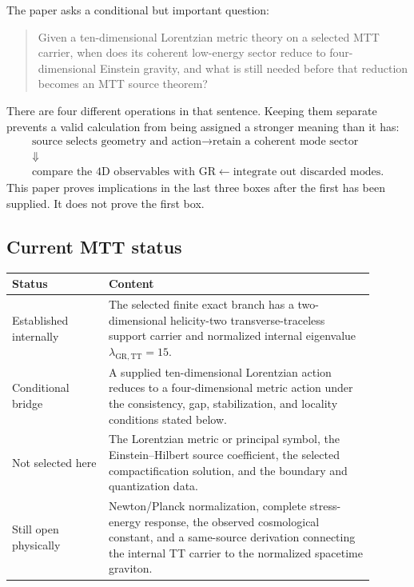 \documentclass[11pt,a4paper]{article}
\theoremstyle{definition}
\theoremstyle{remark}
\newcommand{\TT}{\mathrm{TT}}
\begin{document}
The paper asks a conditional but important question:
\begin{quote}
Given a ten-dimensional Lorentzian metric theory on a selected MTT carrier,
when does its coherent low-energy sector reduce to four-dimensional Einstein
gravity, and what is still needed before that reduction becomes an MTT source
theorem?
\end{quote}
There are four different operations in that sentence.  Keeping them separate
prevents a valid calculation from being assigned a stronger meaning than it
has:
\[
\begin{gathered}
\boxed{\text{source selects geometry and action}}
\longrightarrow
\boxed{\text{retain a coherent mode sector}}
\\[1mm]
\Downarrow
\\[-1mm]
\boxed{\text{compare the 4D observables with GR}}
\longleftarrow
\boxed{\text{integrate out discarded modes}} .
\end{gathered}
\]
This paper proves implications in the last three boxes after the first has
been supplied.  It does not prove the first box.

\subsection{Current MTT status}

\begin{center}
\begin{tabular}{p{0.24\linewidth}p{0.66\linewidth}}
\toprule
Status & Content \\
\midrule
Established internally &
The selected finite exact branch has a two-dimensional helicity-two
transverse-traceless support carrier and normalized internal eigenvalue
\(\lambda_{\mathrm{GR},\TT}=15\). \\
Conditional bridge &
A supplied ten-dimensional Lorentzian action reduces to a four-dimensional
metric action under the consistency, gap, stabilization, and locality
conditions stated below. \\
Not selected here &
The Lorentzian metric or principal symbol, the Einstein--Hilbert source
coefficient, the selected compactification solution, and the boundary and
quantization data. \\
Still open physically &
Newton/Planck normalization, complete stress-energy response, the observed
cosmological constant, and a same-source derivation connecting the internal
TT carrier to the normalized spacetime graviton. \\
\bottomrule
\end{tabular}
\end{center}
\end{document}
